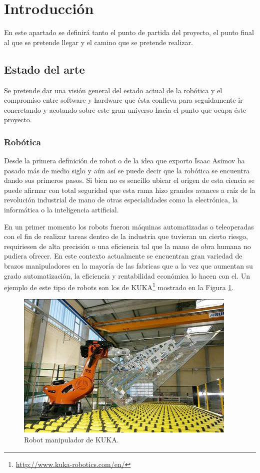 \documentclass[12pt,a4paper,final,twoside]{book}
\begin{document}
\section{Introducción}
En este apartado se definirá tanto el punto de partida del proyecto, el punto final al que se pretende llegar y el camino que se pretende realizar. 
 
\subsection{Estado del arte}\label{estatdelart}
Se pretende dar una visión general del estado actual de la robótica y el compromiso entre software y hardware que ésta conlleva para seguidamente ir concretando y acotando sobre este gran universo hacia el punto que ocupa éste proyecto. 

\subsubsection{Robótica}

Desde la primera definición de robot o de la idea que exporto Isaac Asimov ha pasado más de medio siglo y aún así se puede decir que la robótica se encuentra dando sus primeros pasos. Si bien no es sencillo ubicar el origen de esta ciencia se puede afirmar con total seguridad que esta rama hizo grandes avances a raíz de la revolución industrial de mano de otras especialidades como la electrónica, la informática o la inteligencia artificial.

En un primer momento los robots fueron máquinas automatizadas o teleoperadas con el fin de realizar tareas dentro de la industria que tuvieran un cierto riesgo, requiriesen de alta precisión o una eficiencia tal que la mano de obra humana no pudiera ofrecer. En este contexto actualmente se encuentran gran variedad de brazos manipuladores en la mayoría de las fabricas que a la vez que aumentan su grado automatización, la eficiencia y rentabilidad económica lo hacen con el\cite{libroblanco}. Un ejemplo de este tipo de robots son los de KUKA\footnote{\url{http://www.kuka-robotics.com/en/}} mostrado en la Figura \ref{fig:kuka}.
 
\begin{figure}[h!]
	\centering
    \includegraphics[scale=3]	{images/kuka.jpg}
	 \caption{Robot manipulador de KUKA.}
  \label{fig:kuka}
\end{figure}
\end{document}
